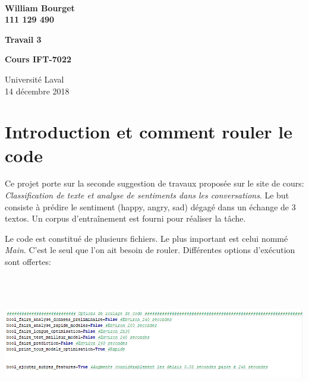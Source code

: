 \documentclass[12pt,french]{article}
\begin{document}
\begin{titlepage}
\begin{center}
\hspace{0pt}\\
\vspace{4cm}

{\Large\bfseries William Bourget}\\[5pt]
{\bfseries 111 129 490}
\vspace{4cm}

{\LARGE\bfseries Travail 3}\\[10pt]
\vspace{4cm}

{\bfseries Cours IFT-7022}\\[10pt]
 \vfill
 
 
 Université Laval\\
14 décembre 2018

\end{center}
\end{titlepage}


\section{Introduction et comment rouler le code}
Ce projet porte sur la seconde suggestion de travaux proposée sur le site de cours: \emph{ Classification de texte et analyse de sentiments dans les conversations}. Le but consiste à prédire le sentiment (happy, angry, sad) dégagé dans un échange de 3 textos. Un corpus d'entraînement est fourni pour réaliser la tâche. 

Le code est constitué de plusieurs fichiers. Le plus important est celui nommé \emph{Main}. C'est le seul que l'on ait besoin de rouler. Différentes options d'exécution sont offertes:

\includegraphics[width=\linewidth,height=6cm]{list_bool}
\end{document}
